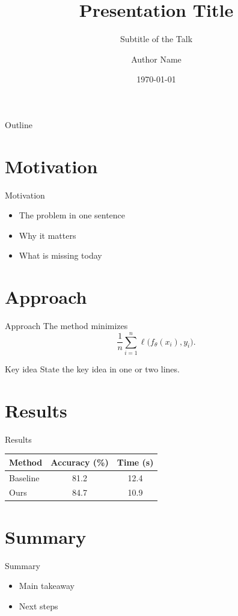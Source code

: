 \documentclass[aspectratio=169]{beamer}
\title[Short Title]{Presentation Title}
\subtitle{Subtitle of the Talk}
\author{Author Name}
\institute{Department, University}
\date{\today}
\begin{document}
\begin{frame}
  \titlepage
\end{frame}

\begin{frame}{Outline}
  \tableofcontents
\end{frame}

\section{Motivation}
\begin{frame}{Motivation}
  \begin{itemize}
    \item The problem in one sentence
    \item Why it matters
    \item What is missing today
  \end{itemize}
\end{frame}

\section{Approach}
\begin{frame}{Approach}
  The method minimizes
  \begin{equation*}
    \frac{1}{n} \sum_{i=1}^{n} \ell\bigl(f_\theta(x_i), y_i\bigr) .
  \end{equation*}
  \begin{block}{Key idea}
    State the key idea in one or two lines.
  \end{block}
\end{frame}

\section{Results}
\begin{frame}{Results}
  \centering
  \begin{tabular}{lcc}
    \toprule
    Method   & Accuracy (\%) & Time (s) \\
    \midrule
    Baseline & 81.2          & 12.4     \\
    Ours     & 84.7          & 10.9     \\
    \bottomrule
  \end{tabular}
\end{frame}

\section{Summary}
\begin{frame}{Summary}
  \begin{itemize}
    \item Main takeaway
    \item Next steps
  \end{itemize}
\end{frame}
\end{document}
